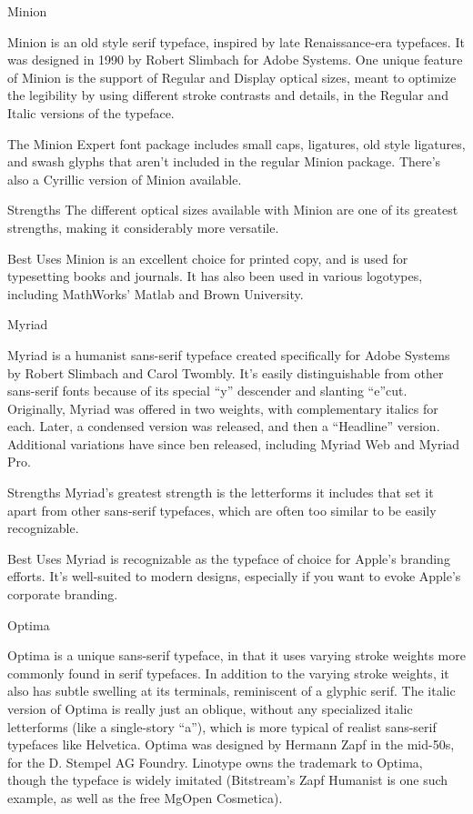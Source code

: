 \documentclass[12pt,a4paper,twocolumn]{book} %
\begin{document}
 
Minion

Minion is an old style serif typeface, inspired by late Renaissance-era typefaces. It was designed in 1990 by Robert Slimbach for Adobe Systems. One unique feature of Minion is the support of Regular and Display optical sizes, meant to optimize the legibility by using different stroke contrasts and details, in the Regular and Italic versions of the typeface.

The Minion Expert font package includes small caps, ligatures, old style ligatures, and swash glyphs that aren’t included in the regular Minion package. There’s also a Cyrillic version of Minion available.

Strengths
The different optical sizes available with Minion are one of its greatest strengths, making it considerably more versatile.

Best Uses
Minion is an excellent choice for printed copy, and is used for typesetting books and journals. It has also been used in various logotypes, including MathWorks’ Matlab and Brown University.

 
Myriad

Myriad is a humanist sans-serif typeface created specifically for Adobe Systems by Robert Slimbach and Carol Twombly. It’s easily distinguishable from other sans-serif fonts because of its special “y” descender and slanting “e”cut.
Originally, Myriad was offered in two weights, with complementary italics for each. Later, a condensed version was released, and then a “Headline” version. Additional variations have since ben released, including Myriad Web and Myriad Pro.

Strengths
Myriad’s greatest strength is the letterforms it includes that set it apart from other sans-serif typefaces, which are often too similar to be easily recognizable.

Best Uses
Myriad is recognizable as the typeface of choice for Apple’s branding efforts. It’s well-suited to modern designs, especially if you want to evoke Apple’s corporate branding.

 
Optima

Optima is a unique sans-serif typeface, in that it uses varying stroke weights more commonly found in serif typefaces. In addition to the varying stroke weights, it also has subtle swelling at its terminals, reminiscent of a glyphic serif. The italic version of Optima is really just an oblique, without any specialized italic letterforms (like a single-story “a”), which is more typical of realist sans-serif typefaces like Helvetica.
Optima was designed by Hermann Zapf in the mid-50s, for the D. Stempel AG Foundry. Linotype owns the trademark to Optima, though the typeface is widely imitated (Bitstream’s Zapf Humanist is one such example, as well as the free MgOpen Cosmetica).
\end{document}
